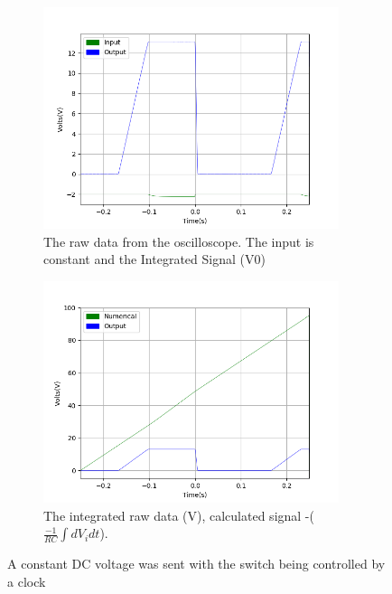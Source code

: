 \begin{figure}[h!]
\centering
\begin{subfigure}[t]{.475\textwidth}
  \centering
  \includegraphics[width=0.95\textwidth, height=0.20\textheight]{figures/Intergration/scope_25raw.png}
  \caption{The raw data from the oscilloscope. The input is constant and the Integrated Signal (V0)}
 \label{fig:int_2_og_data}
\end{subfigure}\hfill
\begin{subfigure}[t]{.475\textwidth}
  \centering
  \includegraphics[width=0.95\textwidth, height=0.20\textheight]{figures/Intergration/scope_25.png}
  \caption{The integrated raw data (V), calculated signal -($\frac{-1}{RC}\int dV_i dt$).}
\label{fig:int_2_calc_data}
\end{subfigure}
\caption{A constant DC voltage was sent with the switch being controlled by a clock}
\label{fig:sum_2}
\end{figure}


